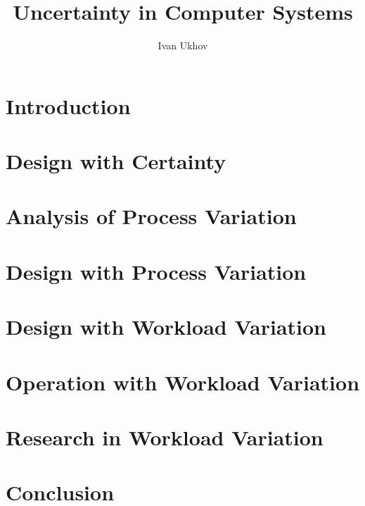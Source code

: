 \documentclass{thesis}
\title{Uncertainty in Computer Systems}
\author{Ivan Ukhov}
\begin{document}
\nocite{ukhov2012, ukhov2014a, ukhov2014b, ukhov2015, ukhov2017}

\chapter{Introduction}
\newcommand{\inputsection}{}


\chapter{Design with Certainty}
\renewcommand{\inputsection}[1]{}


\chapter{Analysis of Process Variation}
\renewcommand{\inputsection}[1]{}


\chapter{Design with Process Variation}
\renewcommand{\inputsection}[1]{}


\chapter{Design with Workload Variation}
\renewcommand{\inputsection}[1]{}


\chapter{Operation with Workload Variation}
\renewcommand{\inputsection}[1]{}


\chapter{Research in Workload Variation}
\renewcommand{\inputsection}[1]{}


\chapter{Conclusion}


\printbibliography
\end{document}
